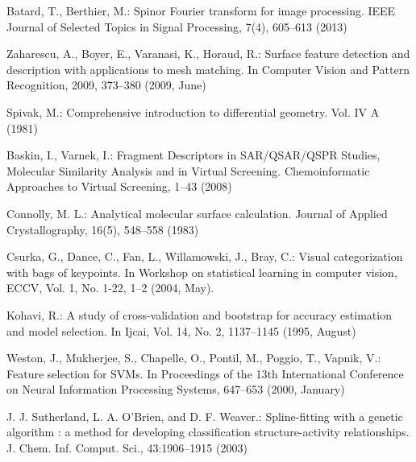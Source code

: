 \documentclass[twocolumn]{svjour3}          %
\begin{document}
\begin{thebibliography}{16}
Batard, T., Berthier, M.:
Spinor Fourier transform for image processing. 
IEEE Journal of Selected Topics in Signal Processing, 7(4), 605--613 (2013)

Zaharescu, A., Boyer, E., Varanasi, K., Horaud, R.:
Surface feature detection and description with applications to mesh matching. 
In Computer Vision and Pattern Recognition, 2009, 373--380 (2009, June)



Spivak, M.: 
Comprehensive introduction to differential geometry.
Vol. IV A (1981)

Baskin, I., Varnek, I.:
Fragment Descriptors in SAR/QSAR/QSPR Studies, Molecular Similarity Analysis and in Virtual Screening.
Chemoinformatic Approaches to Virtual Screening, 1--43 (2008)

Connolly, M. L.:
Analytical molecular surface calculation. 
Journal of Applied Crystallography, 16(5), 548--558 (1983)

Csurka, G., Dance, C., Fan, L., Willamowski, J., Bray, C.: 
Visual categorization with bags of keypoints. 
In Workshop on statistical learning in computer vision, ECCV, Vol. 1, No. 1-22, 1--2 (2004, May). 

Kohavi, R.:
A study of cross-validation and bootstrap for accuracy estimation and model selection. 
In Ijcai, Vol. 14, No. 2, 1137--1145 (1995, August)

Weston, J., Mukherjee, S., Chapelle, O., Pontil, M., Poggio, T., Vapnik, V.:
Feature selection for SVMs. 
In Proceedings of the 13th International Conference on Neural Information Processing Systems, 647--653 (2000, January)

J. J. Sutherland, L. A. O’Brien, and D. F. Weaver.:
Spline-fitting with a genetic algorithm : a method for developing classification structure-activity relationships.
J. Chem. Inf. Comput. Sci., 43:1906–1915 (2003)

\end{thebibliography}
\end{document}
